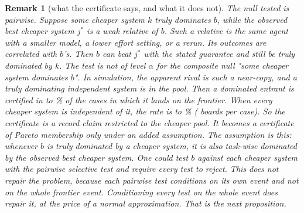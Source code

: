 \documentclass[11pt]{article}
\newtheorem{remark}{Remark}
\begin{document}
\begin{remark}[what the certificate says, and what it does not]
\label{rem:certificate}
The null tested is pairwise. Suppose some cheaper system $k$ truly dominates $b$, while the observed best cheaper system $j^*$ is a weak relative of $b$. Such a relative is the same agent with a smaller model, a lower effort setting, or a rerun. Its outcomes are correlated with $b$'s. Then $b$ can beat $j^*$ with the stated guarantee and still be truly dominated by $k$. The test is not of level $\alpha$ for the composite null "some cheaper system dominates $b$". In simulation, the apparent rival is such a near-copy, and a truly dominating independent system is in the pool. Then a dominated entrant is certified in \NumEntrantNullCopyMin{} to \NumEntrantNullCopyMax\% of the cases in which it lands on the frontier. When every cheaper system is independent of it, the rate is \NumEntrantNullIndepMin{} to \NumEntrantNullIndepMax\% (\NumEntrantNullR{} boards per case). So the certificate is a record claim restricted to the cheaper pool. It becomes a certificate of Pareto membership only under an added assumption. The assumption is this: whenever $b$ is truly dominated by a cheaper system, it is also task-wise dominated by the observed best cheaper system. One could test $b$ against each cheaper system with the pairwise selective test and require every test to reject. This does not repair the problem, because each pairwise test conditions on its own event and not on the whole frontier event. Conditioning every test on the whole event does repair it, at the price of a normal approximation. That is the next proposition.
\end{remark}
\end{document}
